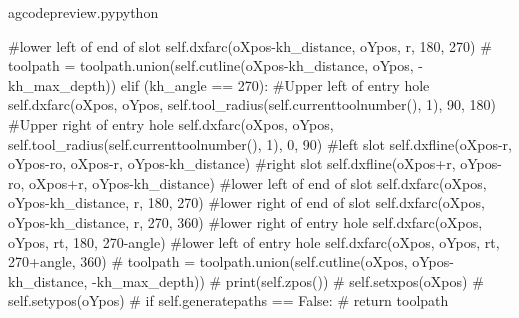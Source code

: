 \documentclass{ltxdoc}
\begin{document}
\begin{writecode}{a}{gcodepreview.py}{python}
{#lower left of end of slot
            self.dxfarc(oXpos-kh_distance, oYpos, r, 180, 270)
#            toolpath = toolpath.union(self.cutline(oXpos-kh_distance, oYpos, -kh_max_depth))
        elif (kh_angle == 270):
#Upper left of entry hole
            self.dxfarc(oXpos, oYpos, self.tool_radius(self.currenttoolnumber(), 1), 90, 180)
#Upper right of entry hole
            self.dxfarc(oXpos, oYpos, self.tool_radius(self.currenttoolnumber(), 1), 0, 90)
#left slot
            self.dxfline(oXpos-r, oYpos-ro, oXpos-r, oYpos-kh_distance)
#right slot
            self.dxfline(oXpos+r, oYpos-ro, oXpos+r, oYpos-kh_distance)
#lower left of end of slot
            self.dxfarc(oXpos, oYpos-kh_distance, r, 180, 270)
#lower right of end of slot
            self.dxfarc(oXpos, oYpos-kh_distance, r, 270, 360)
#lower right of entry hole
            self.dxfarc(oXpos, oYpos, rt, 180, 270-angle)
#lower left of entry hole
            self.dxfarc(oXpos, oYpos, rt, 270+angle, 360)
#            toolpath = toolpath.union(self.cutline(oXpos, oYpos-kh_distance, -kh_max_depth))
#        print(self.zpos())
#        self.setxpos(oXpos)
#        self.setypos(oYpos)
#        if self.generatepaths == False:
#            return toolpath
            
}
\end{writecode}
\end{document}
